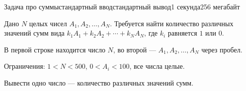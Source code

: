 \begin{problem}{Задача про суммы}{стандартный ввод}{стандартный вывод}{1 секунда}{256 мегабайт}

Дано $N$ целых чисел $A_1, A_2, \ldots, A_N$. Требуется найти количество различных значений сумм вида
$k_1A_1 + k_2A_2 + \cdots + k_NA_N$, где $k_i$ равняется $1$ или $0$.


\InputFile
В первой строке находится число $N$, во второй ---
$A_1, A_2, \ldots, A_N$ через пробел.

Ограничения: $1 < N < 500$, $0 < A_i < 100$, все числа целые.


\OutputFile
Вывести одно число --- количество различных значений сумм.

\Examples

\begin{example}
%
%
%
\end{example}

\end{problem}

